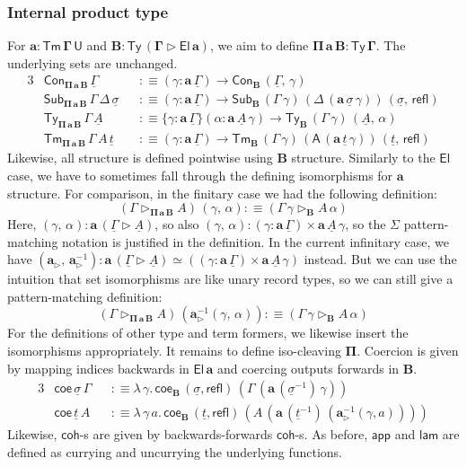 \documentclass[12pt,a4paper,twoside,openany]{book}
\theoremstyle{remark}
\theoremstyle{definition}
\theoremstyle{theorem}
\newcommand{\bs}[1]{\boldsymbol{#1}}
\newcommand{\refl}{\mathsf{refl}}
\newcommand{\Con}{\mathsf{Con}}
\newcommand{\Sub}{\mathsf{Sub}}
\newcommand{\Tm}{\mathsf{Tm}}
\newcommand{\Ty}{\mathsf{Ty}}
\newcommand{\U}{\mathsf{U}}
\newcommand{\El}{\mathsf{El}}
\newcommand{\ext}{\triangleright}
\newcommand{\appi}{\mathsf{app}}
\newcommand{\lami}{\mathsf{lam}}
\newcommand{\A}{\mathsf{A}}
\newcommand{\bTy}{\bs{\Ty}}
\newcommand{\bGamma}{\bs{\Gamma}}
\newcommand{\ba}{\bs{a}}
\newcommand{\bB}{\bs{B}}
\newcommand{\bEl}{\bs{\El}}
\newcommand{\ul}[1]{\underline{#1}}
\newcommand{\ulGamma}{\ul{\Gamma}}
\newcommand{\ulsigma}{\ul{\sigma}}
\newcommand{\ult}{\ul{t}}
\newcommand{\ulA}{\ul{A}}
\newcommand{\coe}{\mathsf{coe}}
\newcommand{\coh}{\mathsf{coh}}
\newcommand{\defn}{:\equiv}
\begin{document}
\subsubsection{Internal product type}

For $\boldsymbol{a : \Tm\,\Gamma\,\U}$ and $\boldsymbol{B :
  \Ty\,(\Gamma\ext\El\,a)}$, we aim to define $\boldsymbol{\Pi\,a\,B}
\boldsymbol{:} \bTy\,\bGamma$. The underlying sets are unchanged.
\begin{alignat*}{3}
  & \Con_{\bs{\Pi\,a\,B}}\,\ulGamma &&\defn (\gamma : \ba\,\ulGamma) \to \Con_{\bB}\,(\ulGamma,\,\gamma)\\
  & \Sub_{\bs{\Pi\,a\,B}}\,\Gamma\,\Delta\,\ulsigma &&\defn
    (\gamma : \ba\,\ulGamma)\to \Sub_{\bB}\,(\Gamma\,\gamma)\,(\Delta\,(\ba\,\ulsigma\,\gamma))\,(\ulsigma,\,\refl)\\
  & \Ty_{\bs{\Pi\,a\,B}}\,\Gamma\,\ulA &&\defn
  \{\gamma : \ba\,\ulGamma\}(\alpha : \ba\,\ulA\,\gamma)
  \to \Ty_{\bB}\,(\Gamma\,\gamma)\,(\ulA,\,\alpha)\\
  & \Tm_{\bs{\Pi\,a\,B}}\,\Gamma\,A\,\ult &&\defn
    (\gamma : \ba\,\ulGamma) \to \Tm_{\bB}\,(\Gamma\,\gamma)\,(\A\,(\ba\,\ult\,\gamma))\,(\ult,\,\refl)
\end{alignat*}
Likewise, all structure is defined pointwise using $\bB$ structure. Similarly to
the $\bEl$ case, we have to sometimes fall through the defining isomorphisms for
$\ba$ structure. For comparison, in the finitary case we had the following definition:
\[
  (\Gamma \ext_{\bs{\Pi\,a\,B}} A)\,(\gamma,\,\alpha) \defn (\Gamma\,\gamma \ext_{\bB} A\,\alpha)
\]
Here, $(\gamma,\,\alpha) : \ba\,(\ulGamma \ext \ulA)$, so also
$(\gamma,\,\alpha) : (\gamma : \ba\,\ulGamma) \times \ba\,\ulA\,\gamma$, so the
$\Sigma$ pattern-matching notation is justified in the definition. In the
current infinitary case, we have $(\ba_{\ext},\,\ba_{\ext}^{-1}) :
\ba\,(\ulGamma \ext \ulA) \simeq ((\gamma : \ba\,\ulGamma) \times
\ba\,\ulA\,\gamma)$ instead. But we can use the intuition that set isomorphisms
are like unary record types, so we can still give a pattern-matching definition:
\[
  (\Gamma \ext_{\bs{\Pi\,a\,B}} A)\,(\ba_{\ext}^{-1}(\gamma,\,\alpha)) \defn
   (\Gamma\,\gamma \ext_{\bB} A\,\alpha)
\]
For the definitions of other type and term formers, we likewise insert the
isomorphisms appropriately. It remains to define iso-cleaving
$\bs{\Pi}$. Coercion is given by mapping indices backwards in $\bEl\,\ba$ and
coercing outputs forwards in $\bB$.
\begin{alignat*}{3}
  & \coe\,\ulsigma\,\Gamma &&\defn
    \lambda\,\gamma.\,\coe_{\bB}\,(\ulsigma,\refl)\,(\Gamma\,(\ba\,(\ulsigma^{-1})\,\gamma))\\
  & \coe\,\ult\,A &&\defn
    \lambda\,\gamma\,a.\,\coe_{\bB}\,(\ult,\refl)\,(A\,(\ba\,(\ult^{-1})\,(\ba_{\ext}^{-1}(\gamma,a))))
\end{alignat*}
Likewise, $\coh$-s are given by backwards-forwards $\coh$-s. As before,
$\bs{\appi}$ and $\bs{\lami}$ are defined as currying and uncurrying the
underlying functions.
\end{document}
